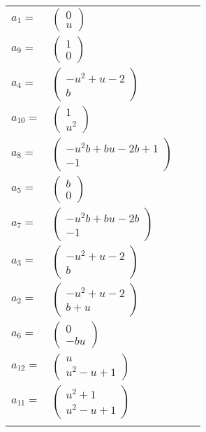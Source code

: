 \documentclass[1p]{elsarticle_modified}
\theoremstyle{definition}
\begin{document}
\begin{tabular}{m{7pt} m{180pt} m{7pt} m{180pt} }
\flushright $a_{1}=$&$\begin{pmatrix}0\\u\end{pmatrix}$ \\
\flushright $a_{9}=$&$\begin{pmatrix}1\\0\end{pmatrix}$ \\
\flushright $a_{4}=$&$\begin{pmatrix}- u^2+u-2\\b\end{pmatrix}$ \\
\flushright $a_{10}=$&$\begin{pmatrix}1\\u^2\end{pmatrix}$ \\
\flushright $a_{8}=$&$\begin{pmatrix}- u^2 b+b u-2 b+1\\-1\end{pmatrix}$ \\
\flushright $a_{5}=$&$\begin{pmatrix}b\\0\end{pmatrix}$ \\
\flushright $a_{7}=$&$\begin{pmatrix}- u^2 b+b u-2 b\\-1\end{pmatrix}$ \\
\flushright $a_{3}=$&$\begin{pmatrix}- u^2+u-2\\b\end{pmatrix}$ \\
\flushright $a_{2}=$&$\begin{pmatrix}- u^2+u-2\\b+u\end{pmatrix}$ \\
\flushright $a_{6}=$&$\begin{pmatrix}0\\- b u\end{pmatrix}$ \\
\flushright $a_{12}=$&$\begin{pmatrix}u\\u^2- u+1\end{pmatrix}$ \\
\flushright $a_{11}=$&$\begin{pmatrix}u^2+1\\u^2- u+1\end{pmatrix}$\\&\end{tabular}
\end{document}
